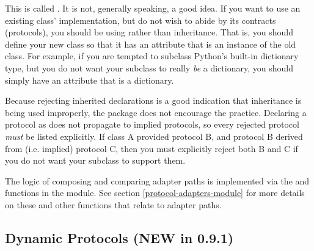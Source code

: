 \begin{verbatim%
}
\begin{verbatim%
}
\begin{verbatim%
}
\begin{verbatim%
}
\begin{verbatim%
}
\begin{verbatim%
}
This is called .  It is not,
generally speaking, a good idea.  If you want to use an existing class'
implementation, but do not wish to abide by its contracts (protocols), you
should be using  rather than inheritance.  That is, you
should define your new class so that it has an attribute that is an instance of
the old class.  For example, if you are tempted to subclass Python's built-in
dictionary type, but you do not want your subclass to really \emph{be} a
dictionary, you should simply have an attribute that is a dictionary.

Because rejecting inherited declarations is a good indication that inheritance
is being used improperly, the  package does not encourage the
practice.  Declaring a protocol as  does not
propagate to implied protocols, so every rejected protocol \emph{must} be
listed explicitly.  If class A provided protocol B, and protocol B derived
from (i.e. implied) protocol C, then you must explicitly reject both B and C
if you do not want your subclass to support them.

\begin{seealso}

The logic of composing and comparing adapter paths is implemented via the
 and  functions in the
 module.  See section \ref{protocol-adapters-module}
for more details on these and other functions that relate to adapter paths.


\end{seealso}














\newpage
\subsection{Dynamic Protocols (NEW in 0.9.1)\label{protocols-generated}}


\end{verbatim%
}
\end{verbatim%
}
\end{verbatim%
}
\end{verbatim%
}
\end{verbatim%
}
\end{verbatim%
}
